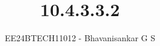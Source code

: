 \documentclass[journal]{IEEEtran}
\begin{document}

\vspace{3cm}

\title{10.4.3.3.2}
\author{EE24BTECH11012 - Bhavanisankar G S}
{\let\newpage\relax\maketitle}

\renewcommand{\thefigure}{\theenumi}
\renewcommand{\thetable}{\theenumi}
\setlength{\intextsep}{10pt} %


\renewcommand{\thetable}{\theenumi}
\end{document}
